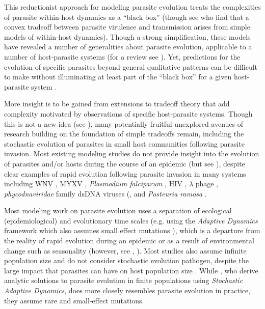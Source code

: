 This reductionist approach for modeling parasite evolution treats the complexities of parasite within-host dynamics as a ``black box'' (though see \citealt{AlizonandvanBaalen2005} who find that a convex tradeoff between parasite virulence and transmission arises from simple models of within-host dynamics). Though a strong simplification, these models have revealed a number of generalities about parasite evolution, applicable to a number of host-parasite systems (for a review see \citealt{Cressleretal.2016}). Yet, predictions for the evolution of specific parasites beyond general qualitative patterns can be difficult to make without illuminating at least part of the ``black box'' for a given host-parasite system \citep{AlizonandMichalakis2015}. 

More insight is to be gained from extensions to tradeoff theory that add complexity motivated by observations of specific host-parasite systems. Though this is not a new idea (see \citealt{Cressleretal.2016}), many potentially fruitful unexplored avenues of research building on the foundation of simple tradeoffs remain, including the stochastic evolution of parasites in small host communities following parasite invasion. Most existing modeling studies do not provide insight into the evolution of parasites and/or hosts during the course of an epidemic (but see \citealt{Bolkeretal.2010, LionandMetz2018, Parsonsetal.2018}), despite clear examples of rapid evolution following parasite invasion in many systems including WNV \cite{Beasleyetal.2003}, MYXV \citep{FennerandMarshall1957}, \emph{Plasmodium falciparum} \cite{Flemingetal.2018}, HIV \cite{Fraseretal.2007}, $\lambda$ phage \cite{Berngruberetal.2015}, \emph{phycodnaviridae} family dsDNA viruses (\citep{Frickeletal.2016, Frickeletal.2018}, and \emph{Pasteuria ramosa} \citep{Duffyetal.2009}.

Most modeling work on parasite evolution uses a separation of ecological (epidemiological) and evolutionary time scales (e.g. using the \emph{Adaptive Dynamics} framework which also assumes small effect mutations \citealt{Diekmann2002}), which is a departure from the reality of rapid evolution during an epidemic or as a result of environmental change such as seasonality \citep{Lion2018} (however, see \citealt{Bolkeretal.2010}, \citealt{LionandMetz2018}). Most studies also assume infinite population size and do not consider stochastic evolution pathogen, despite the large impact that parasites can have on host population size \citep{Frickeletal.2016, Frickeletal.2018}. While \citet{Parsonsetal.2018}, who derive analytic solutions to parasite evolution in finite populations using \emph{Stochastic Adaptive Dynamics}, does more closely resembles parasite evolution in practice, they assume rare and small-effect mutations. 

